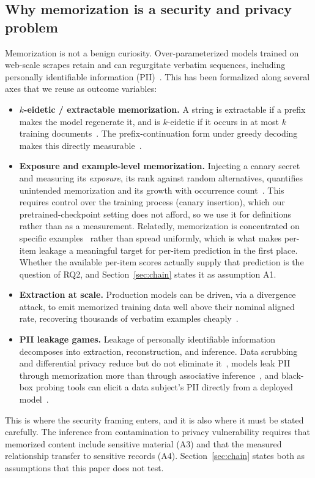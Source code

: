 \subsection{Why memorization is a security and privacy problem}
Memorization is not a benign curiosity. Over-parameterized models trained on
web-scale scrapes retain and can regurgitate verbatim sequences, including personally
identifiable information (PII)~\citep{carlini2021extracting}. This has been formalized along several axes that
we reuse as outcome variables:
\begin{itemize}
 \item \textbf{$k$-eidetic / extractable memorization.} A string is extractable if a
 prefix makes the model regenerate it, and is $k$-eidetic if it occurs in at most $k$
 training documents~\citep{carlini2021extracting}. The prefix-continuation form under
 greedy decoding makes this directly measurable~\citep{carlini2023quantifying}.
 \item \textbf{Exposure and example-level memorization.} Injecting a canary secret and
 measuring its \emph{exposure}, its rank against random alternatives, quantifies
 unintended memorization and its growth with occurrence count~\citep{carlini2019secret}.
 This requires control over the training process (canary insertion), which our
 pretrained-checkpoint setting does not afford, so we use it for definitions rather than
 as a measurement. Relatedly, memorization is concentrated on specific
 examples~\citep{zhang2023counterfactual} rather than spread uniformly, which is what
 makes per-item leakage a meaningful target for per-item prediction in the first place.
 Whether the available per-item scores actually supply that prediction is the question
 of RQ2, and Section~\ref{sec:chain} states it as assumption A1.
 \item \textbf{Extraction at scale.} Production models can be driven, via a divergence
 attack, to emit memorized training data well above their nominal aligned rate,
 recovering thousands of verbatim examples cheaply~\citep{nasr2025scalable}.
 \item \textbf{PII leakage games.} Leakage of personally identifiable information
 decomposes into extraction, reconstruction, and inference. Data scrubbing and
 differential privacy reduce but do not eliminate it~\citep{lukas2023pii}, models leak
 PII through memorization more than through associative
 inference~\citep{huang2022leaking}, and black-box probing tools can elicit a data
 subject's PII directly from a deployed model~\citep{kim2023propile}.
\end{itemize}
This is where the security framing enters, and it is also where it must be stated
carefully. The inference from contamination to privacy vulnerability requires that
memorized content include sensitive material (A3) and that the measured relationship
transfer to sensitive records (A4). Section~\ref{sec:chain} states both as assumptions
that this paper does not test.

